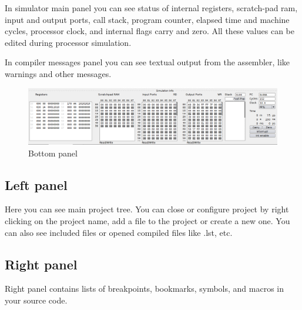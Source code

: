     In simulator main panel you can see status of internal registers, scratch-pad ram, input and output ports, call
    stack, program counter, elapsed time and machine cycles, processor clock, and internal flags carry and zero. All
    these values can be edited during processor simulation.

    In compiler messages panel you can see textual output from the assembler, like warnings and other messages.

    \begin{figure}[h!]
        \centering
        \includegraphics[width=\textwidth]{img/bottom_panel.png}
        \caption{Bottom panel}
    \end{figure}

\subsection{Left panel}
    Here you can see main project tree. You can close or configure project by right clicking on the project name, add a
    file to the project or create a new one. You can also see included files or opened compiled files like .lst, etc.

\subsection{Right panel}
    Right panel contains lists of breakpoints, bookmarks, symbols, and macros in your source code.

